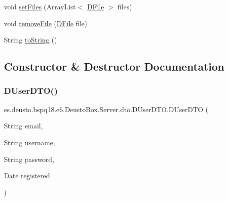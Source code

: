 \begin{DoxyCompactItemize}
void \mbox{\hyperlink{classes_1_1deusto_1_1bspq18_1_1e6_1_1_deusto_box_1_1_server_1_1dto_1_1_d_user_d_t_o_a580f3598cc54d6c95adee8a8e2cc53c3}{set\+Files}} (Array\+List$<$ \mbox{\hyperlink{classes_1_1deusto_1_1bspq18_1_1e6_1_1_deusto_box_1_1_server_1_1jdo_1_1data_1_1_d_file}{D\+File}} $>$ files)
\item 
void \mbox{\hyperlink{classes_1_1deusto_1_1bspq18_1_1e6_1_1_deusto_box_1_1_server_1_1dto_1_1_d_user_d_t_o_ace99ab26a6316fa791a52582d810d829}{remove\+File}} (\mbox{\hyperlink{classes_1_1deusto_1_1bspq18_1_1e6_1_1_deusto_box_1_1_server_1_1jdo_1_1data_1_1_d_file}{D\+File}} file)
\item 
String \mbox{\hyperlink{classes_1_1deusto_1_1bspq18_1_1e6_1_1_deusto_box_1_1_server_1_1dto_1_1_d_user_d_t_o_a9ef195d0f4d4e5d935acd6c5499e6105}{to\+String}} ()
\end{DoxyCompactItemize}


\subsection{Constructor \& Destructor Documentation}
\mbox{\label{classes_1_1deusto_1_1bspq18_1_1e6_1_1_deusto_box_1_1_server_1_1dto_1_1_d_user_d_t_o_aad0716a4872f8d0c62fc725f26db28db}} 
\subsubsection{\texorpdfstring{D\+User\+D\+T\+O()}{DUserDTO()}}
{\footnotesize\ttfamily es.\+deusto.\+bspq18.\+e6.\+Deusto\+Box.\+Server.\+dto.\+D\+User\+D\+T\+O.\+D\+User\+D\+TO (\begin{DoxyParamCaption}\item[{String}]{email,  }\item[{String}]{username,  }\item[{String}]{password,  }\item[{Date}]{registered }\end{DoxyParamCaption})}



